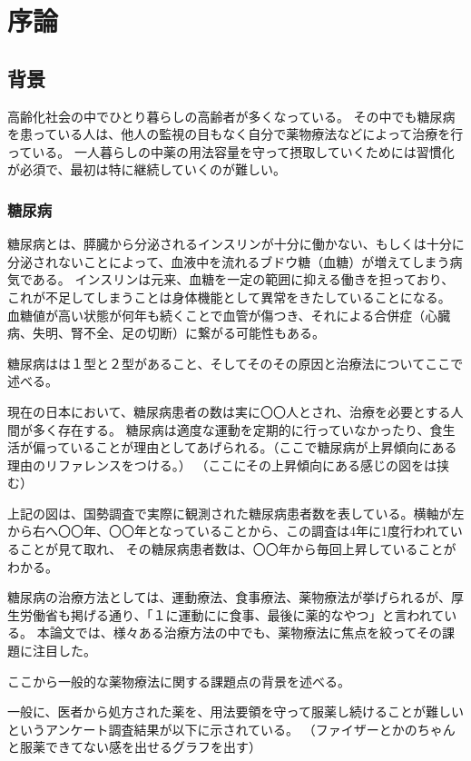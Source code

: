 \chapter{序論}
\label{chap:introduction}

\section{背景}
\label{section:background}
高齢化社会の中でひとり暮らしの高齢者が多くなっている。
その中でも糖尿病を患っている人は、他人の監視の目もなく自分で薬物療法などによって治療を行っている。
一人暮らしの中薬の用法容量を守って摂取していくためには習慣化が必須で、最初は特に継続していくのが難しい。

\subsection{糖尿病}
糖尿病とは、膵臓から分泌されるインスリンが十分に働かない、もしくは十分に分泌されないことによって、血液中を流れるブドウ糖（血糖）が増えてしまう病気である。
インスリンは元来、血糖を一定の範囲に抑える働きを担っており、これが不足してしまうことは身体機能として異常をきたしていることになる。
血糖値が高い状態が何年も続くことで血管が傷つき、それによる合併症（心臓病、失明、腎不全、足の切断）に繋がる可能性もある。

糖尿病はは１型と２型があること、そしてそのその原因と治療法についてここで述べる。

現在の日本において、糖尿病患者の数は実に〇〇人とされ、治療を必要とする人間が多く存在する。
糖尿病は適度な運動を定期的に行っていなかったり、食生活が偏っていることが理由としてあげられる。（ここで糖尿病が上昇傾向にある理由のリファレンスをつける。）
（ここにその上昇傾向にある感じの図をは挟む）

上記の図は、国勢調査で実際に観測された糖尿病患者数を表している。横軸が左から右へ〇〇年、〇〇年となっていることから、この調査は4年に1度行われていることが見て取れ、
その糖尿病患者数は、〇〇年から毎回上昇していることがわかる。

糖尿病の治療方法としては、運動療法、食事療法、薬物療法が挙げられるが、厚生労働省も掲げる通り、「１に運動にに食事、最後に薬的なやつ」と言われている。
本論文では、様々ある治療方法の中でも、薬物療法に焦点を絞ってその課題に注目した。


ここから一般的な薬物療法に関する課題点の背景を述べる。

一般に、医者から処方された薬を、用法要領を守って服薬し続けることが難しいというアンケート調査結果が以下に示されている。
（ファイザーとかのちゃんと服薬できてない感を出せるグラフを出す）

